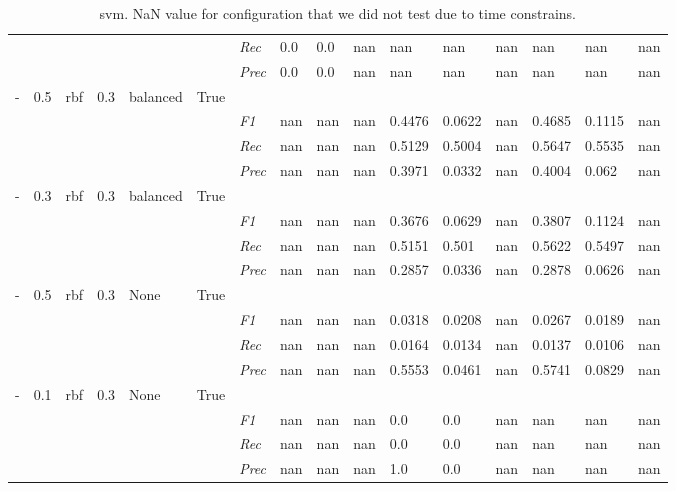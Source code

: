 \begin{table}[]
\begin{tabularx}{\textwidth}{XXXXXX|X|XXX|XXX|XXX}
    & & & & & & \textit{Rec} & 0.0 & 0.0 & nan    & nan & nan    & nan    & nan    & nan    & nan    \\
    & & & & & & \textit{Prec} & 0.0 & 0.0 & nan & nan & nan & nan & nan & nan & nan \\ \midrule
    - & 0.5 & rbf & 0.3 & balanced &True & & & & & & & & & \\
    & & & & & & \textit{F1} & nan & nan & nan & 0.4476 & 0.0622        & nan        & 0.4685        & 0.1115        & nan        \\
    & & & & & & \textit{Rec} & nan & nan & nan    & 0.5129 & 0.5004    & nan    & 0.5647    & 0.5535    & nan    \\
    & & & & & & \textit{Prec} & nan & nan & nan & 0.3971 & 0.0332 & nan & 0.4004 & 0.062 & nan \\ \midrule
    - & 0.3 & rbf & 0.3 & balanced &True & & & & & & & & & \\
    & & & & & & \textit{F1} & nan & nan & nan & 0.3676 & 0.0629        & nan        & 0.3807        & 0.1124        & nan        \\
    & & & & & & \textit{Rec} & nan & nan & nan    & 0.5151 & 0.501    & nan    & 0.5622    & 0.5497    & nan    \\
    & & & & & & \textit{Prec} & nan & nan & nan & 0.2857 & 0.0336 & nan & 0.2878 & 0.0626 & nan \\ \midrule
    - & 0.5 & rbf & 0.3 & None &True & & & & & & & & & \\
    & & & & & & \textit{F1} & nan & nan & nan & 0.0318 & 0.0208        & nan        & 0.0267        & 0.0189        & nan        \\
    & & & & & & \textit{Rec} & nan & nan & nan    & 0.0164 & 0.0134    & nan    & 0.0137    & 0.0106    & nan    \\
    & & & & & & \textit{Prec} & nan & nan & nan & 0.5553 & 0.0461 & nan & 0.5741 & 0.0829 & nan \\ \midrule
    - & 0.1 & rbf & 0.3 & None &True & & & & & & & & & \\
    & & & & & & \textit{F1} & nan & nan & nan & 0.0 & 0.0        & nan        & nan        & nan        & nan        \\
    & & & & & & \textit{Rec} & nan & nan & nan    & 0.0 & 0.0    & nan    & nan    & nan    & nan    \\
    & & & & & & \textit{Prec} & nan & nan & nan & 1.0 & 0.0 & nan & nan & nan & nan \\ \midrule
    \end{tabularx}
\caption{svm. NaN value for configuration that we did not test due to time constrains.}
\label{tab:all_results_svm}
\end{table}